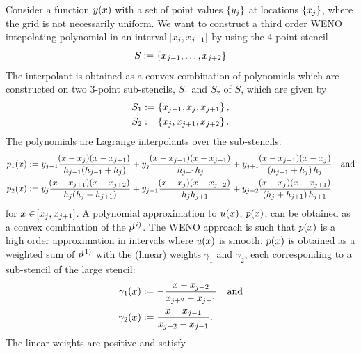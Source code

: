 \documentclass[final]{amsart}
\numberwithin{equation}{section}
\begin{document}
Consider a function $y\!\left({x}\right)$ with a set of point values $\left\lbrace y_j\right\rbrace$ at locations $\left\lbrace x_j\right\rbrace$,  where  the grid is not necessarily uniform. We want to construct a third order WENO intepolating polynomial in an interval $\!\left[{x_j, x_{j+1}}\right]$ by using the $4$-point stencil
\begin{equation}
S:=\left\lbrace x_{j-1},\dots,x_{j+2}\right\rbrace
\end{equation}
 The interpolant is obtained as a convex combination of polynomials which are constructed on two 3-point sub-stencils, $S_1$ and $S_2$ of $S$, which are given by 
\begin{equation}
\begin{aligned}
S_1 &:= \left\lbrace x_{j-1}, x_j, x_{j+1} \right\rbrace,\\
S_2& :=  \left\lbrace x_j, x_{j+1} , x_{j+2}\right\rbrace.
\end{aligned} 
\end{equation} 
The polynomials are  Lagrange interpolants over the sub-stencils:
\begin{equation}
\begin{aligned}
p_1\qp{x}&:= y_{j-1}\frac{\qp{x-x_{j}}\qp{x-x_{j+1}}}{h_{j-1}\qp{h_{j-1}+h_j}} + 
                                y_{j}\frac{\qp{x-x_{j-1}}\qp{x-x_{j+1}}}{h_{j-1}h_j}  +
                                y_{j+1}\frac{\qp{x-x_{j-1}}\qp{x-x_{j}}}{\qp{h_{j-1}+h_j}h_j}\quad\text{and} \\
p_2\qp{x}&:= y_{j}\frac{\qp{x-x_{j+1}}\qp{x-x_{j+2}}}{h_{j}\qp{h_{j}+h_{j+1}}} + 
							  y_{j+1}\frac{\qp{x-x_{j}}\qp{x-x_{j+2}}}{h_{j}h_{j+1}}  +
							  y_{j+2}\frac{\qp{x-x_{j}}\qp{x-x_{j+1}}}{\qp{h_{j}+h_{j+1}}h_{j+1}}
\end{aligned}
\end{equation}
for $x\in \!\left[{x_j, x_{j+1}}\right]$.  A  polynomial approximation to $u\!\left({x}\right)$, $p\!\left({x}\right)$, can be obtained as a convex combination of the $p^{\!\left({i}\right)}$.  The WENO approach is such that $p\!\left({x}\right)$ is a high order approximation in intervals where $u\!\left({x}\right)$ is smooth.  $p\!\left({x}\right)$ is obtained as a weighted sum of $p^{\!\left({1}\right)}$ with  the (linear) weights $\gamma_1$ and $\gamma_2$, each corresponding to a sub-stencil of the large stencil:
\begin{equation}
\begin{aligned}
\gamma_1\!\left({x}\right)&:= -\frac{x-x_{j+2}}{x_{j+2}-x_{j-1}}\quad\text{and}\\
\gamma_2\!\left({x}\right)&:= \frac{x-x_{j-1}}{x_{j+2}-x_{j-1}}.
\end{aligned}
\end{equation}
The linear weights are positive and satisfy 
\end{document}
